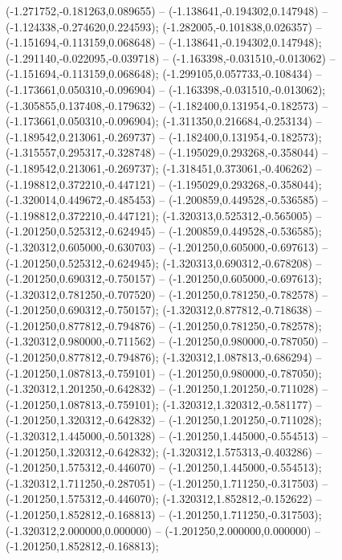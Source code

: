  (-1.271752,-0.181263,0.089655) -- (-1.138641,-0.194302,0.147948) -- (-1.124338,-0.274620,0.224593);
 (-1.282005,-0.101838,0.026357) -- (-1.151694,-0.113159,0.068648) -- (-1.138641,-0.194302,0.147948);
 (-1.291140,-0.022095,-0.039718) -- (-1.163398,-0.031510,-0.013062) -- (-1.151694,-0.113159,0.068648);
 (-1.299105,0.057733,-0.108434) -- (-1.173661,0.050310,-0.096904) -- (-1.163398,-0.031510,-0.013062);
 (-1.305855,0.137408,-0.179632) -- (-1.182400,0.131954,-0.182573) -- (-1.173661,0.050310,-0.096904);
 (-1.311350,0.216684,-0.253134) -- (-1.189542,0.213061,-0.269737) -- (-1.182400,0.131954,-0.182573);
 (-1.315557,0.295317,-0.328748) -- (-1.195029,0.293268,-0.358044) -- (-1.189542,0.213061,-0.269737);
 (-1.318451,0.373061,-0.406262) -- (-1.198812,0.372210,-0.447121) -- (-1.195029,0.293268,-0.358044);
 (-1.320014,0.449672,-0.485453) -- (-1.200859,0.449528,-0.536585) -- (-1.198812,0.372210,-0.447121);
 (-1.320313,0.525312,-0.565005) -- (-1.201250,0.525312,-0.624945) -- (-1.200859,0.449528,-0.536585);
 (-1.320312,0.605000,-0.630703) -- (-1.201250,0.605000,-0.697613) -- (-1.201250,0.525312,-0.624945);
 (-1.320313,0.690312,-0.678208) -- (-1.201250,0.690312,-0.750157) -- (-1.201250,0.605000,-0.697613);
 (-1.320312,0.781250,-0.707520) -- (-1.201250,0.781250,-0.782578) -- (-1.201250,0.690312,-0.750157);
 (-1.320312,0.877812,-0.718638) -- (-1.201250,0.877812,-0.794876) -- (-1.201250,0.781250,-0.782578);
 (-1.320312,0.980000,-0.711562) -- (-1.201250,0.980000,-0.787050) -- (-1.201250,0.877812,-0.794876);
 (-1.320312,1.087813,-0.686294) -- (-1.201250,1.087813,-0.759101) -- (-1.201250,0.980000,-0.787050);
 (-1.320312,1.201250,-0.642832) -- (-1.201250,1.201250,-0.711028) -- (-1.201250,1.087813,-0.759101);
 (-1.320312,1.320312,-0.581177) -- (-1.201250,1.320312,-0.642832) -- (-1.201250,1.201250,-0.711028);
 (-1.320312,1.445000,-0.501328) -- (-1.201250,1.445000,-0.554513) -- (-1.201250,1.320312,-0.642832);
 (-1.320312,1.575313,-0.403286) -- (-1.201250,1.575312,-0.446070) -- (-1.201250,1.445000,-0.554513);
 (-1.320312,1.711250,-0.287051) -- (-1.201250,1.711250,-0.317503) -- (-1.201250,1.575312,-0.446070);
 (-1.320312,1.852812,-0.152622) -- (-1.201250,1.852812,-0.168813) -- (-1.201250,1.711250,-0.317503);
 (-1.320312,2.000000,0.000000) -- (-1.201250,2.000000,0.000000) -- (-1.201250,1.852812,-0.168813);
